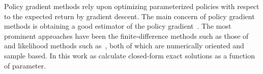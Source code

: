 Policy gradient methods rely upon optimizing parameterized policies with respect to the expected return by gradient descent. The main concern of policy gradient methods is obtaining a good estimator of the policy gradient~\parencite{Peters_IRS_2006}. The most prominent approaches have been the finite-difference methods such as those of~\parencite{Ng_UAI_2000} and likelihood methods such as~\parencite{Baxter_ISCAS_2000}, both of which are numerically oriented and sample based. In this work as calculate closed-form exact solutions as a function of parameter.


